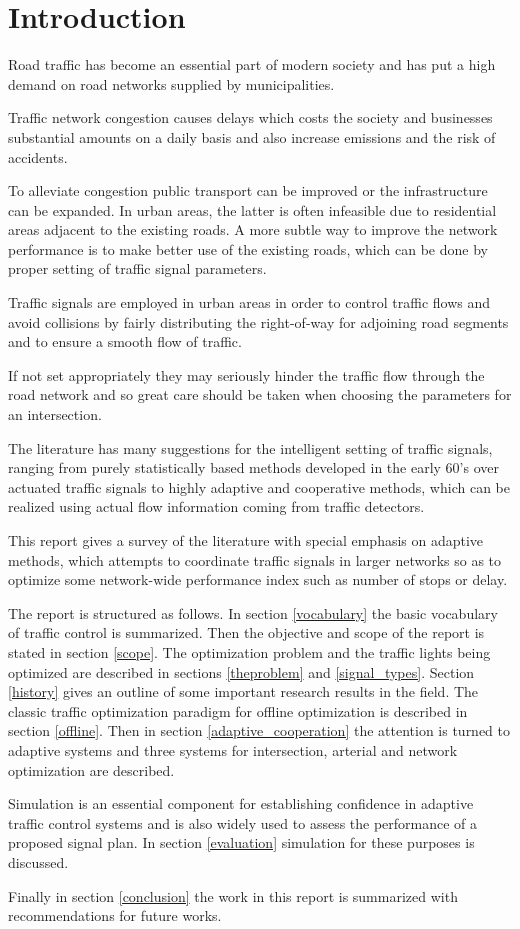 \section{Introduction}
Road traffic has become an essential part of modern society and has put a high demand on road networks supplied by municipalities. 

Traffic network congestion causes delays which costs the society and businesses substantial amounts on a daily basis and also increase emissions and the risk of accidents.

To alleviate congestion public transport can be improved or the infrastructure can be expanded. In urban areas, the latter is often infeasible due to residential areas adjacent to the existing roads. 
A more subtle way to improve the network performance is to make better use of the existing roads, which can be done by proper setting of traffic signal parameters. 

Traffic signals are employed in urban areas in order to control traffic flows and avoid collisions by fairly distributing the right-of-way for adjoining road segments and to ensure a smooth flow of traffic.

If not set appropriately they may seriously hinder the traffic flow through the road network and so great care should be taken when choosing the parameters for an intersection. 

The literature has many suggestions for the intelligent setting of traffic signals, ranging from purely statistically based methods developed in the early 60's over actuated traffic signals to highly adaptive and cooperative methods, which can be realized using actual flow information coming from traffic detectors. 

This report gives a survey of the literature with special emphasis on adaptive methods, which attempts to coordinate traffic signals in larger networks so as to optimize some network-wide performance index such as number of stops or delay. 

The report is structured as follows. In section \ref{vocabulary} the basic vocabulary of traffic control is summarized. Then the objective and scope of the report is stated in section \ref{scope}. 
The optimization problem and the traffic lights being optimized are described in sections \ref{theproblem} and \ref{signal_types}.
Section \ref{history} gives an outline of some important research results in the field. 
The classic traffic optimization paradigm for offline optimization is described in section \ref{offline}.
Then in section \ref{adaptive_cooperation} the attention is turned to adaptive systems and three systems for intersection, arterial and network optimization are described. 

Simulation is an essential component for establishing confidence in adaptive traffic control systems and is also widely used to assess the performance of a proposed signal plan. In  section \ref{evaluation} simulation for these purposes is discussed.

Finally in section \ref{conclusion} the work in this report is summarized with recommendations for future works.
